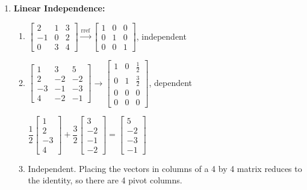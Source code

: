 \begin{multicols}{2}
\begin{enumerate}
\begin{enumerate}
\end{enumerate}






\item \textbf{Linear Independence:} 
\begin{enumerate}
	\item 
$
\begin{bmatrix}
 2 & 1 & 3 \\
 -1 & 0 & 2 \\
 0 & 3 & 4
\end{bmatrix}
\xrightarrow{\text{rref}}
\begin{bmatrix}
 1 & 0 & 0 \\
 0 & 1 & 0 \\
 0 & 0 & 1
\end{bmatrix}
$, 
independent

	\item 
$
\begin{bmatrix}
 1 & 3 & 5 \\
 2 & -2 & -2 \\
 -3 & -1 & -3 \\
 4 & -2 & -1
\end{bmatrix}
\rightarrow
\begin{bmatrix}
 1 & 0 & \frac{1}{2} \\
 0 & 1 & \frac{3}{2} \\
 0 & 0 & 0 \\
 0 & 0 & 0
\end{bmatrix}
$, 
dependent

$\dfrac{1}{2}\begin{bmatrix}
 1 \\
 2 \\
 -3 \\
 4 
\end{bmatrix}
+\dfrac{3}{2}
\begin{bmatrix}
3  \\
-2 \\
-1  \\
-2
\end{bmatrix}
=
\begin{bmatrix}
 5 \\
 -2 \\
-3 \\
-1
\end{bmatrix}$


	\item Independent. Placing the vectors in columns of a 4 by 4 matrix reduces to the identity, so there are 4 pivot columns.


\end{enumerate}
\end{enumerate}
\end{multicols}
